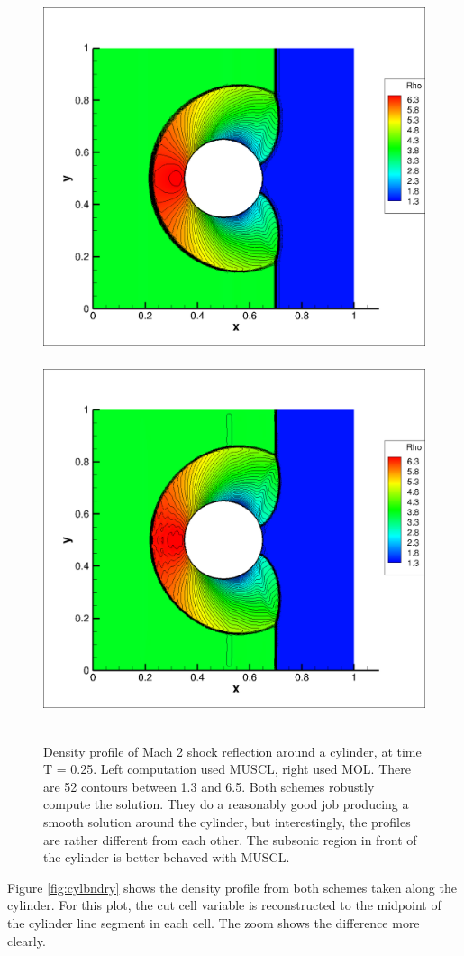 \begin{figure}[h]
\centering
\vspace*{-.25in}
\hspace*{-.2in}
\mbox{
\includegraphics[width=0.50\linewidth,trim=10 10 200 10,clip]{figs/muscl_302cells.png}
\hspace*{.15in}
\includegraphics[width=0.50\linewidth,trim=10 10 200 10,clip]{figs/MOL_302cells.png}
}
\caption{\sf Density profile of Mach 2 shock reflection around a cylinder,
at time T = 0.25.  Left computation used MUSCL, right used MOL. 
There are 52 contours between 1.3 and 6.5.
Both schemes robustly compute the solution. They do a reasonably good job
producing a smooth solution around the cylinder, 
but interestingly, the profiles are rather different from each other.
The subsonic region in front of the cylinder is better behaved with MUSCL.
\label{fig:cyl1}}
\vspace*{-.2in}
\end{figure}

Figure \ref{fig:cylbndry}
shows the density profile from both schemes
taken along the cylinder.
For this plot, the cut cell variable is
reconstructed to the midpoint of the cylinder line segment in each  cell.  
The zoom shows the difference more
clearly.

